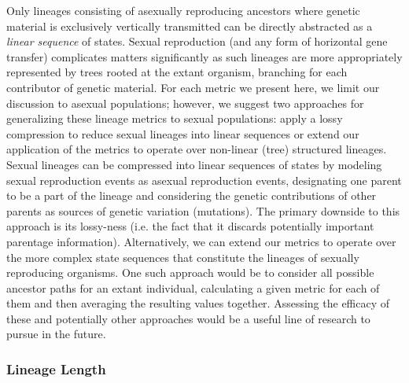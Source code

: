 \documentclass[letterpaper]{article}
\begin{document}
Only lineages consisting of asexually reproducing ancestors where genetic material is exclusively vertically transmitted can be directly abstracted as a \textit{linear sequence} of states. 
Sexual reproduction (and any form of horizontal gene transfer) complicates matters significantly as such lineages are more appropriately represented by trees rooted at the extant organism, branching for each contributor of genetic material. 
For each metric we present here, we limit our discussion to asexual populations; however, we suggest two approaches for generalizing these lineage metrics to sexual populations: apply a lossy compression to reduce sexual lineages into linear sequences or extend our application of the metrics to operate over non-linear (tree) structured lineages. 
Sexual lineages can be compressed into linear sequences of states by modeling sexual reproduction events as asexual reproduction events, designating one parent to be a part of the lineage and considering the genetic contributions of other parents as sources of genetic variation (mutations). The primary downside to this approach is its lossy-ness (i.e. the fact that it discards potentially important parentage information). 
Alternatively, we can extend our metrics to operate over the more complex state sequences that constitute the lineages of sexually reproducing organisms. One such approach would be to consider all possible ancestor paths for an extant individual, calculating a given metric for each of them and then averaging the resulting values together. Assessing the efficacy of these and potentially other approaches would be a useful line of research to pursue in the future.

\subsubsection{Lineage Length}
\end{document}

